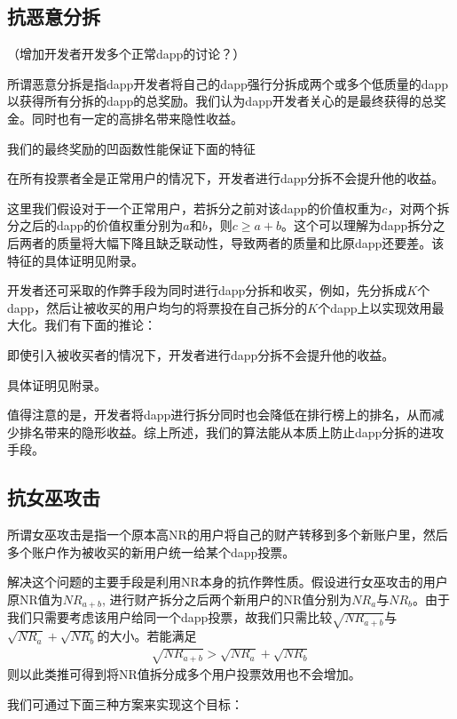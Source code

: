 \subsection{抗恶意分拆}
（增加开发者开发多个正常dapp的讨论？）

所谓恶意分拆是指dapp开发者将自己的dapp强行分拆成两个或多个低质量的dapp以获得所有分拆的dapp的总奖励。我们认为dapp开发者关心的是最终获得的总奖金。同时也有一定的高排名带来隐性收益。

我们的最终奖励的凹函数性能保证下面的特征
\begin{property}
	在所有投票者全是正常用户的情况下，开发者进行dapp分拆不会提升他的收益。
\end{property}
这里我们假设对于一个正常用户，若拆分之前对该dapp的价值权重为$c$，对两个拆分之后的dapp的价值权重分别为$a$和$b$，则$c \geq a+b$。这个可以理解为dapp拆分之后两者的质量将大幅下降且缺乏联动性，导致两者的质量和比原dapp还要差。该特征的具体证明见附录。

开发者还可采取的作弊手段为同时进行dapp分拆和收买，例如，先分拆成$K$个dapp，然后让被收买的用户均匀的将票投在自己拆分的$K$个dapp上以实现效用最大化。我们有下面的推论：
\begin{corollary}
	即使引入被收买者的情况下，开发者进行dapp分拆不会提升他的收益。
\end{corollary}
具体证明见附录。

值得注意的是，开发者将dapp进行拆分同时也会降低在排行榜上的排名，从而减少排名带来的隐形收益。综上所述，我们的算法能从本质上防止dapp分拆的进攻手段。

\subsection{抗女巫攻击}
所谓女巫攻击是指一个原本高NR的用户将自己的财产转移到多个新账户里，然后多个账户作为被收买的新用户统一给某个dapp投票。

解决这个问题的主要手段是利用NR本身的抗作弊性质。假设进行女巫攻击的用户原NR值为$NR_{a+b}$, 进行财产拆分之后两个新用户的NR值分别为$NR_a$与$NR_b$。由于我们只需要考虑该用户给同一个dapp投票，故我们只需比较$\sqrt{NR_{a+b}}$与$\sqrt{NR_a}+\sqrt{NR_b}$的大小。若能满足
\begin{align}
\label{sybil}
\sqrt{NR_{a+b}}>\sqrt{NR_a}+\sqrt{NR_b}
\end{align}
则以此类推可得到将NR值拆分成多个用户投票效用也不会增加。

我们可通过下面三种方案来实现这个目标：

